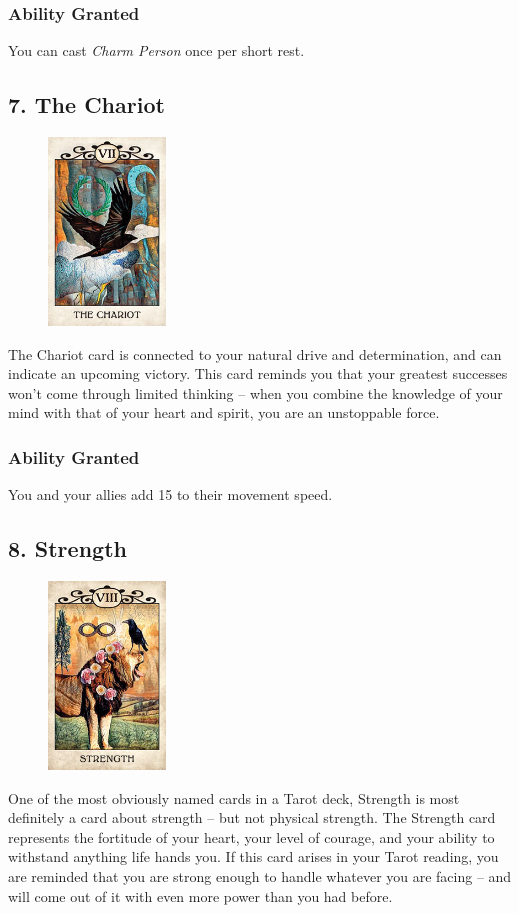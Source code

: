 \documentclass[10pt,twoside,twocolumn,openany,nodeprecatedcode]{dndbook}
\begin{document}
    \subsubsection*{Ability Granted}
    You can cast \emph{Charm Person} once per short rest.

    \subsection*{7. The Chariot}

    \begin{figure}
        \includegraphics[height=5cm,width=\linewidth]{chariot.jpg}
    \end{figure}
    The Chariot card is connected to your natural drive and determination, and can indicate an upcoming victory. This card reminds you that your greatest successes won't come through limited thinking -- when you combine the knowledge of your mind with that of your heart \newpage and spirit, you are an unstoppable force.

    \subsubsection*{Ability Granted}
    You and your allies add 15 to their movement speed.

    \subsection*{8. Strength}

    \begin{figure}
        \includegraphics[height=5cm,width=\linewidth]{strength.jpg}
    \end{figure}
    One of the most obviously named cards in a Tarot deck, Strength is most definitely a card about strength -- but not physical strength. The Strength card represents the fortitude of your heart, your level of courage, and your ability to withstand anything life hands you. If this card arises in your Tarot reading, you are reminded that you are strong enough to handle whatever you are facing -- and will come out of it with even more power than you had before.
    
\end{document}

